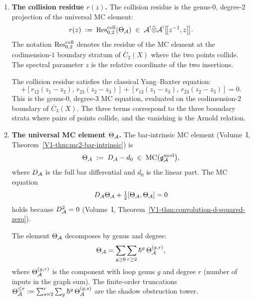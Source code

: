 \begin{enumerate}[label=\textbf{Component (\alph*):}, leftmargin=4.5em, itemsep=1.5ex]
\item \textbf{The collision residue $r(z)$.}
The collision residue is the genus-$0$, degree-$2$ projection of the
universal MC element:
\begin{equation}%
r(z) \;:=\; \Res^{\mathrm{coll}}_{0,2}(\Theta_\cA)
\;\in\;
\cA^! \ohat \cA^!\bigl[\!\bigl[z^{-1}, z\bigr]\!\bigr].
\end{equation}
The notation $\operatorname{Res}^{\mathrm{coll}}_{0,2}$ denotes the residue of the
MC element at the codimension-$1$ boundary stratum of $\overline{C}_2(X)$
where the two points collide. The spectral parameter $z$ is the
relative coordinate of the two insertions.

The collision residue satisfies the classical Yang--Baxter equation:
\begin{equation}%
[r_{12}(z_1-z_2),\, r_{13}(z_1-z_3)]
+ [r_{12}(z_1-z_2),\, r_{23}(z_2-z_3)]
+ [r_{13}(z_1-z_3),\, r_{23}(z_2-z_3)]
= 0.
\end{equation}
This is the genus-$0$, degree-$3$ MC equation, evaluated on the
codimension-$2$ boundary of $\overline{C}_3(X)$. The three terms
correspond to the three boundary strata where pairs of points
collide, and the vanishing is the Arnold relation.

\item \textbf{The universal MC element $\Theta_{\mathcal{A}}$.}
The bar-intrinsic MC element
(Volume~I, Theorem~\ref*{V1-thm:mc2-bar-intrinsic}) is
\begin{equation}%
\Theta_\cA \;:=\; D_\cA - d_0
\;\in\;
\MC\bigl(\gAmod\bigr),
\end{equation}
where $D_{\mathcal{A}}$ is the full bar differential and $d_0$ is the linear
part. The MC equation
\begin{equation}%
D_\cA \Theta_\cA + \tfrac{1}{2}[\Theta_\cA, \Theta_\cA] = 0
\end{equation}
holds because $D_{\mathcal{A}}^2 = 0$
(Volume~I, Theorem~\ref{V1-thm:convolution-d-squared-zero}).

The element $\Theta_{\mathcal{A}}$ decomposes by genus and degree:
\begin{equation}%
\Theta_\cA
= \sum_{g \ge 0} \sum_{r \ge 2} \hbar^g\, \Theta_\cA^{(g,r)},
\end{equation}
where $\Theta_{\mathcal{A}}^{(g,r)}$ is the component with loop genus $g$
and degree $r$ (number of inputs in the graph sum). The finite-order
truncations $\Theta_{\mathcal{A}}^{\le r} := \sum_{s=2}^{r}\sum_g
\hbar^g\,\Theta_{\mathcal{A}}^{(g,s)}$ are the shadow obstruction tower.


\end{enumerate}
